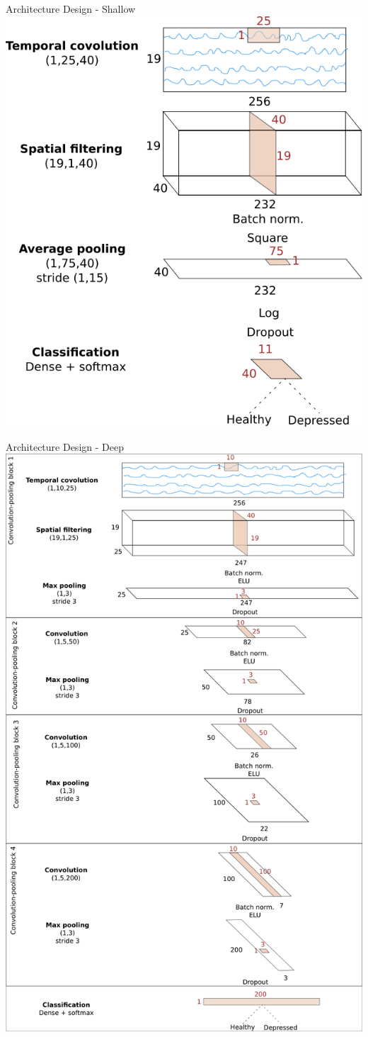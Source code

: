 \documentclass{beamer}
\begin{document}

\begin{frame}{Architecture Design - Shallow}
  \centering
  \includegraphics[width=0.6\linewidth]{./Images/shal.png}
\end{frame}


\begin{frame}{Architecture Design - Deep}
  \centering
  \includegraphics[width=0.4\linewidth]{./Images/deep.png}
\end{frame}

\end{document}
